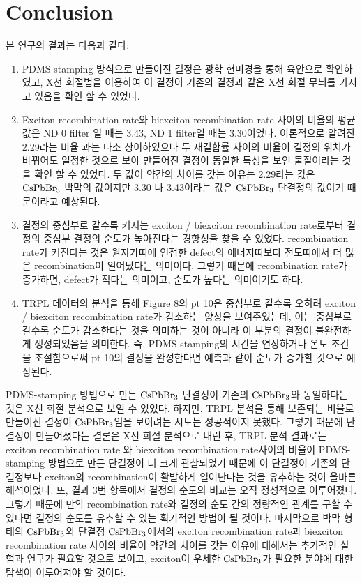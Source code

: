 \newpage

\section{Conclusion}
본 연구의 결과는 다음과 같다:
\begin{enumerate} 
	\item PDMS stamping 방식으로 만들어진 결정은 광학 현미경을 통해 육안으로 확인하였고, X선 회절법을 이용하여 이 결정이 기존의 결정과 같은 X선 회절 무늬를 가지고 있음을 확인 할 수 있었다.
	\item	
	Exciton recombination rate와 biexciton recombination rate 사이의 비율의 평균값은 ND 0 filter 일 때는 3.43, ND 1 filter일 때는 3.30이었다. 이론적으로 알려진 2.29라는 비율\cite{chen2018room} 과는 다소 상이하였으나 두 재결합률 사이의 비율이 결정의 위치가 바뀌어도 일정한 것으로 보아 만들어진 결정이 동일한 특성을 보인 물질이라는 것을 확인 할 수 있었다. 두 값이 약간의 차이를 갖는 이유는 2.29라는 값은 $\rm{CsPbBr_3}$ 박막의 값이지만 3.30 나 3.43이라는 값은 $\rm{CsPbBr_3}$ 단결정의 값이기 때문이라고 예상된다.  
	\item 결정의 중심부로 갈수록 커지는 exciton / biexciton recombination rate로부터 결정의 중심부 결정의 순도가 높아진다는 경향성을 찾을 수 있었다. recombination rate가 커진다는 것은 원자가띠에 인접한 defect의 에너지띠보다 전도띠에서 더 많은 recombination이 일어났다는 의미이다. 그렇기 때문에 recombination rate가 증가하면, defect가 적다는 의미이고, 순도가 높다는 의미이기도 하다.
	\item TRPL 데이터의 분석을 통해 Figure 8의 pt 10은 중심부로 갈수록 오히려 exciton / biexciton recombination rate가 감소하는 양상을 보여주었는데, 이는 중심부로 갈수록 순도가 감소한다는 것을 의미하는 것이 아니라 이 부분의 결정이 불완전하게 생성되었음을 의미한다. 즉, PDMS-stamping의 시간을 연장하거나 온도 조건을 조절함으로써 pt 10의 결정을 완성한다면 예측과 같이 순도가 증가할 것으로 예상된다. 
\end{enumerate}
PDMS-stamping 방법으로 만든 $\rm{CsPbBr_3}$ 단결정이 기존의 $\rm{CsPbBr_3}$와 동일하다는 것은 X선 회절 분석으로 보일 수 있었다. 하지만, TRPL 분석을 통해 보존되는 비율로 만들어진 결정이 $\rm{CsPbBr_3}$임을 보이려는 시도는 성공적이지 못했다. 그렇기 때문에 단결정이 만들어졌다는 결론은 X선 회절 분석으로 내린 후, TRPL 분석 결과로는 exciton recombination rate 와 biexciton recombination rate사이의 비율이 PDMS-stamping 방법으로 만든 단결정이 더 크게 관찰되었기 때문에 이 단결정이 기존의 단결정보다 exciton의 recombination이 활발하게 일어난다는 것을 유추하는 것이 올바른 해석이었다.  
또, 결과 3번 항목에서 결정의 순도의 비교는 오직 정성적으로 이루어졌다. 그렇기 때문에 만약 recombination rate와 결정의 순도 간의 정량적인 관계를 구할 수 있다면 결정의 순도를 유추할 수 있는 획기적인 방법이 될 것이다.
마지막으로 박막 형태의 $\rm{CsPbBr_3}$와 단결정 $\rm{CsPbBr_3}$에서의 exciton recombination rate과 biexciton recombination rate 사이의 비율이 약간의 차이를 갖는 이유에 대해서는 추가적인 실험과 연구가 필요할 것으로 보이고, exciton이 우세한 $\rm{CsPbBr_3}$가 필요한 분야에 대한 탐색이 이루어져야 할 것이다. 


